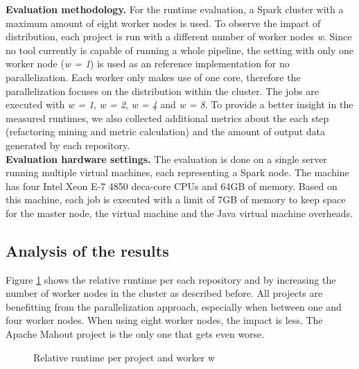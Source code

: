 \textbf{Evaluation methodology.} For the runtime evaluation, a Spark cluster with a maximum amount of eight worker nodes is used. To observe the impact of distribution, each project is run with a different number of worker nodes \emph{w}. Since no tool currently is capable of running a whole pipeline, the setting with only one worker node (\emph{w = 1}) is used as an reference implementation for no parallelization. Each worker only makes use of one core, therefore the parallelization focuses on the distribution within the cluster. The jobs are executed with \emph{w = 1}, \emph{w = 2}, \emph{w = 4} and \emph{w = 8}. To provide a better insight in the measured runtimes, we also collected additional metrics about the each step (refactoring mining and metric calculation) and the amount of output data generated by each repository.\\
\textbf{Evaluation hardware settings.} The evaluation is done on a single server running multiple virtual machines, each representing a Spark node. The machine has four Intel Xeon E-7 4850 deca-core CPUs and 64GB of memory. Based on this machine, each job is executed with a limit of 7GB of memory to keep space for the master node, the virtual machine and the Java virtual machine overheads.

\subsection{Analysis of the results}
Figure \ref{fig:relativeruntime} shows the relative runtime per each repository and by increasing the number of worker nodes in the cluster as described before. All projects are benefitting from the parallelization approach, especially when between one and four worker nodes. When using eight worker nodes, the impact is less. The Apache Mahout project is the only one that gets even worse.

\begin{figure}
    \centering
    \caption{Relative runtime per project and worker w}
    \label{fig:relativeruntime}
\end{figure}

